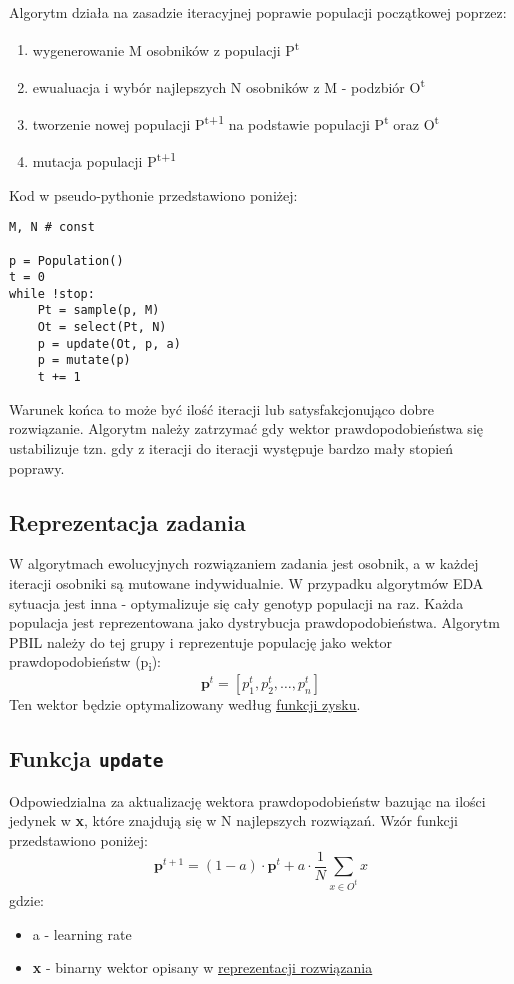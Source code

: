 \documentclass[11pt]{article}
\begin{document}
Algorytm działa na zasadzie iteracyjnej poprawie populacji początkowej poprzez:
\begin{enumerate}
\item wygenerowanie M osobników z populacji P\textsuperscript{t}
\item ewualuacja i wybór najlepszych N osobników z M - podzbiór O\textsuperscript{t}
\item tworzenie nowej populacji P\textsuperscript{t+1} na podstawie populacji P\textsuperscript{t} oraz O\textsuperscript{t}
\item mutacja populacji P\textsuperscript{t+1}
\end{enumerate}
Kod w pseudo-pythonie przedstawiono poniżej:
\begin{verbatim}
M, N # const

p = Population()
t = 0
while !stop:
    Pt = sample(p, M)
    Ot = select(Pt, N)
    p = update(Ot, p, a)
    p = mutate(p)
    t += 1
\end{verbatim}

Warunek końca to może być ilość iteracji lub satysfakcjonująco dobre rozwiązanie. Algorytm należy zatrzymać gdy wektor prawdopodobieństwa się ustabilizuje tzn. gdy z iteracji do iteracji występuje bardzo mały stopień poprawy.
\subsection{Reprezentacja zadania}
\label{sec:org230a810}
W algorytmach ewolucyjnych rozwiązaniem zadania jest osobnik, a w każdej iteracji osobniki są mutowane indywidualnie. W przypadku algorytmów EDA sytuacja jest inna - optymalizuje się cały genotyp populacji na raz. Każda populacja jest reprezentowana jako dystrybucja prawdopodobieństwa. Algorytm PBIL należy do tej grupy i reprezentuje populację jako wektor prawdopodobieństw (p\textsubscript{i}):
\[
        \boldsymbol{p}^t = [p_1^t, p_2^t, \dots, p_n^t]
\]
Ten wektor będzie optymalizowany według \uline{\hyperref[sec:org3b8c70e]{funkcji zysku}}.
\subsection{Funkcja \texttt{update}}
\label{sec:orga587885}
Odpowiedzialna za aktualizację wektora prawdopodobieństw bazując na ilości jedynek w \textbf{x}, które znajdują się w N najlepszych rozwiązań. Wzór funkcji przedstawiono poniżej:
\[
        \boldsymbol{p}^{t+1}=(1-a) \cdot \boldsymbol{p}^t + a \cdot \frac{1}{N} \sum_{x \in O^t}x
\]
gdzie:
\begin{itemize}
\item a - learning rate
\item \textbf{x} - binarny wektor opisany w \hyperref[sec:org357917a]{\uline{reprezentacji rozwiązania}}
\end{itemize}
\end{document}
